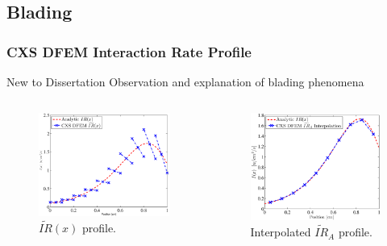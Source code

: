 \documentclass{beamer}
\begin{document}
\subsection{Blading}
\begin{frame}
\frametitle{CXS DFEM Interaction Rate Profile}

\begin{block}{New to Dissertation}
Observation and explanation of blading phenomena
\end{block}
\begin{columns}[c]
\begin{figure}
\includegraphics[width=5cm]{CXS_I_Blades.eps}
\caption{$\widetilde{IR}(x)$ profile.}
\end{figure}
\begin{figure}
\includegraphics[width=5cm]{CXS_I_A_Profile.eps}
\caption{Interpolated $\widetilde{IR}_A$ profile.}
\end{figure}
\end{columns}

\end{frame}
\end{document}

